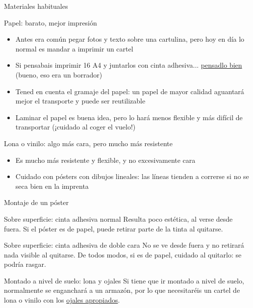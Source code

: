 \documentclass[xcolor=svgnames,compress]{beamer}
\begin{document}
\begin{frame}{Materiales habituales}
  \hypersetup{colorlinks,linkcolor=blue}

  \begin{block}{Papel: barato, mejor impresión}
    \begin{itemize}
    \item Antes era común pegar fotos y texto sobre una cartulina,
      pero hoy en día lo normal es mandar a imprimir un cartel
    \item Si pensabais imprimir 16 A4 y juntarlos con cinta
      adhesiva... \href{http://www.flickr.com/photos/damienclauzel/4465767871/}{pensadlo
        bien} (bueno, eso era un borrador)
    \item Tened en cuenta el gramaje del papel: un papel de mayor
      calidad aguantará mejor el transporte y puede ser reutilizable
    \item Laminar el papel es buena idea, pero lo hará menos flexible
      y más difícil de transportar (¡cuidado al coger el vuelo!)
    \end{itemize}
  \end{block}

  \begin{block}{Lona o vinilo: algo más cara, pero mucho más resistente}
    \begin{itemize}
    \item Es mucho más resistente y flexible, y no excesivamente cara
    \item Cuidado con pósters con dibujos lineales: las líneas
      tienden a correrse si no se seca bien en la imprenta
    \end{itemize}
  \end{block}

\end{frame}

\begin{frame}{Montaje de un póster}

  \begin{block}{Sobre superficie: cinta adhesiva normal}
    Resulta poco estética, al verse desde fuera. Si el póster es de
    papel, puede retirar parte de la tinta al quitarse.
  \end{block}

  \begin{block}{Sobre superficie: cinta adhesiva de doble cara}
    No se ve desde fuera y no retirará nada visible al quitarse. De
    todos modos, si es de papel, cuidado al quitarlo: se podría
    rasgar.
  \end{block}

  \begin{block}{Montado a nivel de suelo: lona y ojales}
    Si tiene que ir montado a nivel de suelo, normalmente se
    enganchará a un armazón, por lo que necesitaréis un cartel de lona
    o vinilo con los
    \href{http://www.printcolorweb.com/spa/item/index.html?msgOrigen=9\&msgValor=58\&CODART=lona}{ojales
      apropiados}.
  \end{block}

\end{frame}
\end{document}
